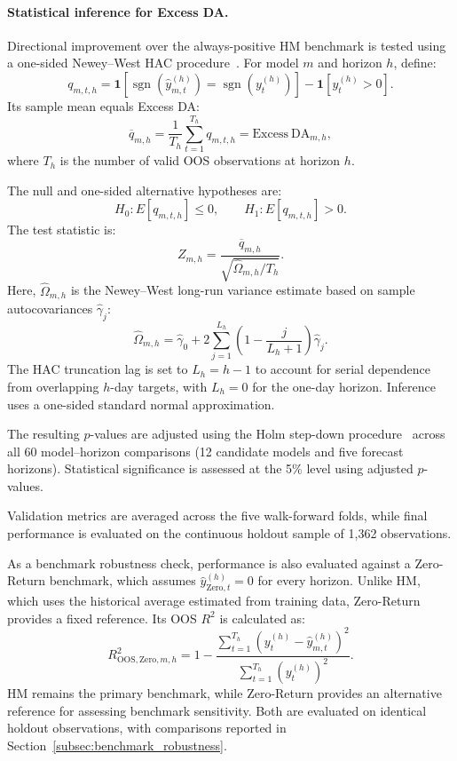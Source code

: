 \documentclass[runningheads,orivec]{llncs}
\begin{document}
\paragraph{Statistical inference for Excess DA.} Directional improvement over the always-positive HM benchmark is tested using a one-sided Newey--West HAC procedure~\cite{newey1987}. For model $m$ and horizon $h$, define:
\[
q_{m,t,h}
=
\mathbf{1}\left[
\operatorname{sgn}(\hat{y}_{m,t}^{(h)})
=
\operatorname{sgn}(y_t^{(h)})
\right]
-
\mathbf{1}\left[y_t^{(h)}>0\right].
\]
Its sample mean equals Excess DA:
\[
\overline{q}_{m,h}
=
\frac{1}{T_h}\sum_{t=1}^{T_h}q_{m,t,h}
=
\mathrm{Excess\ DA}_{m,h},
\]
where $T_h$ is the number of valid OOS observations at horizon $h$.

The null and one-sided alternative hypotheses are:
\[
H_0:E[q_{m,t,h}]\leq 0,
\qquad
H_1:E[q_{m,t,h}]>0.
\]
The test statistic is:
\[
Z_{m,h}
=
\frac{\overline{q}_{m,h}}
{\sqrt{\widehat{\Omega}_{m,h}/T_h}}.
\]
Here, $\widehat{\Omega}_{m,h}$ is the Newey--West long-run variance estimate based on sample autocovariances $\widehat{\gamma}_j$:
\[
\widehat{\Omega}_{m,h}
=
\widehat{\gamma}_0
+
2\sum_{j=1}^{L_h}
\left(1-\frac{j}{L_h+1}\right)
\widehat{\gamma}_j.
\]
The HAC truncation lag is set to $L_h=h-1$ to account for serial dependence from overlapping $h$-day targets, with $L_h=0$ for the one-day horizon. Inference uses a one-sided standard normal approximation.

The resulting $p$-values are adjusted using the Holm step-down procedure~\cite{holm1979} across all 60 model--horizon comparisons (12 candidate models and five forecast horizons). Statistical significance is assessed at the 5\% level using adjusted $p$-values.

Validation metrics are averaged across the five walk-forward folds, while final performance is evaluated on the continuous holdout sample of 1,362 observations.

As a benchmark robustness check, performance is also evaluated against a Zero-Return benchmark, which assumes $\hat{y}^{(h)}_{\mathrm{Zero},t}=0$ for every horizon. Unlike HM, which uses the historical average estimated from training data, Zero-Return provides a fixed reference. Its OOS $R^2$ is calculated as:
\begin{equation}
R^2_{\mathrm{OOS,Zero},m,h} = 1 - \frac{\sum_{t=1}^{T_h}\left(y_t^{(h)}-\hat{y}_{m,t}^{(h)}\right)^2}{\sum_{t=1}^{T_h}\left(y_t^{(h)}\right)^2}.
\end{equation}
HM remains the primary benchmark, while Zero-Return provides an alternative reference for assessing benchmark sensitivity. Both are evaluated on identical holdout observations, with comparisons reported in Section~\ref{subsec:benchmark_robustness}.
\end{document}
